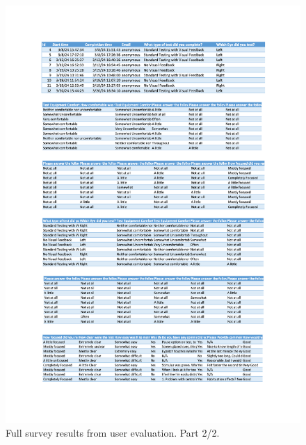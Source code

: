 \documentclass{l4proj}
\begin{document}
\begin{appendices}
\begin{figure}[htbp]
    \includegraphics[page=2,width=1\linewidth]{dissertation/images/Full results.pdf}   
    \caption{Full survey results from user evaluation. Part 2/2.}
\end{figure}
\newpage

\end{appendices}
\end{document}

